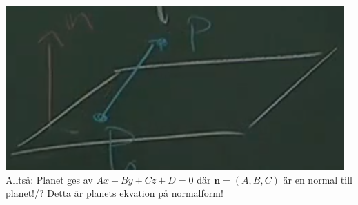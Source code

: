 \includegraphics[scale=0.5]{imgs/img02.png}\\
Alltså: Planet ges av $Ax+By+Cz+D=0$ där $\bm{n}=(A,B,C)$ är en normal till planet!/?
Detta är planets ekvation på normalform!


